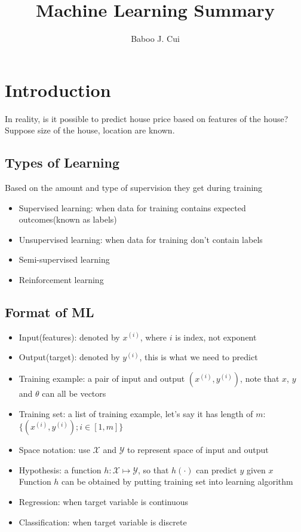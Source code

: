 \documentclass[10pt,a4paper,oneside]{article}
\author{Baboo J. Cui}
\begin{document}
\title{Machine Learning Summary}
\maketitle
\newpage
\tableofcontents

\newpage
\section{Introduction}
In reality, is it possible to predict house price based on features of the house? Suppose size of the house, location are known.

\subsection{Types of Learning}
Based on the amount and type of supervision they get during training
\begin{itemize}
	\item Supervised learning: when data for training contains expected outcomes(known as labels)
	\item Unsupervised learning: when data for training don't contain labels
	\item Semi-supervised learning
	\item Reinforcement learning
\end{itemize}

\subsection{Format of ML}
\begin{itemize}
	\item Input(features): denoted by $x^{(i)}$, where $i$ is index, not exponent
	\item Output(target): denoted by $y^{(i)}$, this is what we need to predict
	\item Training example: a pair of input and output $(x^{(i)}, y^{(i)})$, note that $x$, $y$  and $\theta$ can all be vectors
	\item Training set: a list of training example, let's say it has length of $m$: $\{(x^{(i)}, y^{(i)}); i \in [1,m]\}$
	\item Space notation: use $\mathcal{X}$ and $\mathcal{Y}$ to represent space of input and output
	\item Hypothesis: a function $h:\mathcal{X} \mapsto \mathcal{Y}$, so that $h(\cdot)$ can predict $y$ given $x$ Function $h$ can be obtained by putting training set into learning algorithm
	\item Regression: when target variable is continuous
	\item Classification: when target variable is discrete
\end{itemize}
\end{document}
